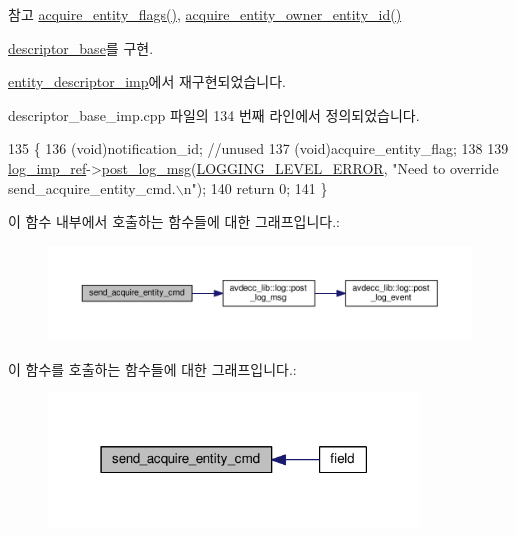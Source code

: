 \begin{DoxySeeAlso}{참고}
\hyperlink{classavdecc__lib_1_1descriptor__base__imp_a2d270d205bcea948cf61311a1f8336c6}{acquire\+\_\+entity\+\_\+flags()}, \hyperlink{classavdecc__lib_1_1descriptor__base__imp_a507b250a984bb5611d2699cd26d60a51}{acquire\+\_\+entity\+\_\+owner\+\_\+entity\+\_\+id()} 
\end{DoxySeeAlso}


\hyperlink{classavdecc__lib_1_1descriptor__base_adfd0cf2a51bff7d762b0efc743480c48}{descriptor\+\_\+base}를 구현.



\hyperlink{classavdecc__lib_1_1entity__descriptor__imp_aea9e3053b75477816c15487d3e9a6f70}{entity\+\_\+descriptor\+\_\+imp}에서 재구현되었습니다.



descriptor\+\_\+base\+\_\+imp.\+cpp 파일의 134 번째 라인에서 정의되었습니다.


\begin{DoxyCode}
135 \{
136     (void)notification\_id; \textcolor{comment}{//unused}
137     (void)acquire\_entity\_flag;
138 
139     \hyperlink{namespaceavdecc__lib_acbe3e2a96ae6524943ca532c87a28529}{log\_imp\_ref}->\hyperlink{classavdecc__lib_1_1log_a68139a6297697e4ccebf36ccfd02e44a}{post\_log\_msg}(\hyperlink{namespaceavdecc__lib_a501055c431e6872ef46f252ad13f85cdaf2c4481208273451a6f5c7bb9770ec8a}{LOGGING\_LEVEL\_ERROR}, \textcolor{stringliteral}{"Need to
       override send\_acquire\_entity\_cmd.\(\backslash\)n"});
140     \textcolor{keywordflow}{return} 0;
141 \}
\end{DoxyCode}


이 함수 내부에서 호출하는 함수들에 대한 그래프입니다.\+:
\nopagebreak
\begin{figure}[H]
\begin{center}
\leavevmode
\includegraphics[width=350pt]{classavdecc__lib_1_1descriptor__base__imp_aea9e3053b75477816c15487d3e9a6f70_cgraph}
\end{center}
\end{figure}




이 함수를 호출하는 함수들에 대한 그래프입니다.\+:
\nopagebreak
\begin{figure}[H]
\begin{center}
\leavevmode
\includegraphics[width=279pt]{classavdecc__lib_1_1descriptor__base__imp_aea9e3053b75477816c15487d3e9a6f70_icgraph}
\end{center}
\end{figure}


